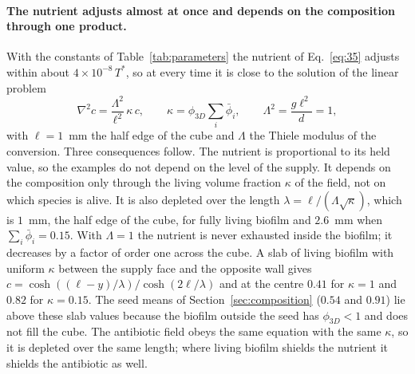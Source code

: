 \documentclass[11pt,a4paper]{article}
\newcommand{\phiD}{\phi_{3D}}
\newcommand{\lv}{\textstyle\sum_i\bar\phi_i}
\begin{document}
\paragraph{The nutrient adjusts almost at once and depends on the composition through one product.} With the constants of Table~\ref{tab:parameters} the nutrient of Eq.~\eqref{eq:35} adjusts within about $4\times10^{-8}\,T^*$, so at every time it is close to the solution of the linear problem
\begin{equation}
\nabla^2 c=\frac{\Lambda^2}{\ell^2}\,\kappa\,c,\qquad \kappa=\phiD\lv,\qquad \Lambda^2=\frac{g\ell^2}{d}=1,
\label{eq:thiele}
\end{equation}
with $\ell=1$~mm the half edge of the cube and $\Lambda$ the Thiele modulus of the conversion. Three consequences follow. The nutrient is proportional to its held value, so the examples do not depend on the level of the supply. It depends on the composition only through the living volume fraction $\kappa$ of the field, not on which species is alive. It is also depleted over the length $\lambda=\ell/(\Lambda\sqrt\kappa)$, which is $1$~mm, the half edge of the cube, for fully living biofilm and $2.6$~mm when $\lv=0.15$. With $\Lambda=1$ the nutrient is never exhausted inside the biofilm; it decreases by a factor of order one across the cube. A slab of living biofilm with uniform $\kappa$ between the supply face and the opposite wall gives $c=\cosh((\ell-y)/\lambda)/\cosh(2\ell/\lambda)$ and at the centre $0.41$ for $\kappa=1$ and $0.82$ for $\kappa=0.15$. The seed means of Section~\ref{sec:composition} ($0.54$ and $0.91$) lie above these slab values because the biofilm outside the seed has $\phiD<1$ and does not fill the cube. The antibiotic field obeys the same equation with the same $\kappa$, so it is depleted over the same length; where living biofilm shields the nutrient it shields the antibiotic as well.
\end{document}

